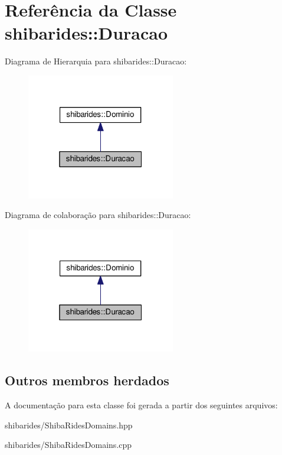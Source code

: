 \hypertarget{classshibarides_1_1Duracao}{}\section{Referência da Classe shibarides\+:\+:Duracao}
\label{classshibarides_1_1Duracao}


Diagrama de Hierarquia para shibarides\+:\+:Duracao\+:\nopagebreak
\begin{figure}[H]
\begin{center}
\leavevmode
\includegraphics[width=184pt]{classshibarides_1_1Duracao__inherit__graph}
\end{center}
\end{figure}


Diagrama de colaboração para shibarides\+:\+:Duracao\+:\nopagebreak
\begin{figure}[H]
\begin{center}
\leavevmode
\includegraphics[width=184pt]{classshibarides_1_1Duracao__coll__graph}
\end{center}
\end{figure}
\subsection*{Outros membros herdados}


A documentação para esta classe foi gerada a partir dos seguintes arquivos\+:\begin{DoxyCompactItemize}
\item 
shibarides/Shiba\+Rides\+Domains.\+hpp\item 
shibarides/Shiba\+Rides\+Domains.\+cpp\end{DoxyCompactItemize}
